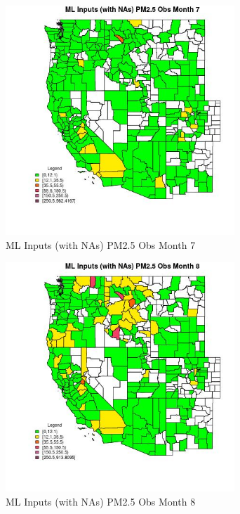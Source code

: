 \begin{figure} 
\centering  
\includegraphics[width=0.77\textwidth]{Code_Outputs/Report_ML_input_PM25_Step4_part_e_de_duplicated_aves_compiled_2019-05-21wNAs_CountyPM25_ObsmedianMonth7.jpg} 
\caption{\label{fig:Report_ML_input_PM25_Step4_part_e_de_duplicated_aves_compiled_2019-05-21wNAsCountyPM25_ObsmedianMonth7}ML Inputs (with NAs) PM2.5 Obs Month 7} 
\end{figure} 
 

\begin{figure} 
\centering  
\includegraphics[width=0.77\textwidth]{Code_Outputs/Report_ML_input_PM25_Step4_part_e_de_duplicated_aves_compiled_2019-05-21wNAs_CountyPM25_ObsmedianMonth8.jpg} 
\caption{\label{fig:Report_ML_input_PM25_Step4_part_e_de_duplicated_aves_compiled_2019-05-21wNAsCountyPM25_ObsmedianMonth8}ML Inputs (with NAs) PM2.5 Obs Month 8} 
\end{figure} 
 

